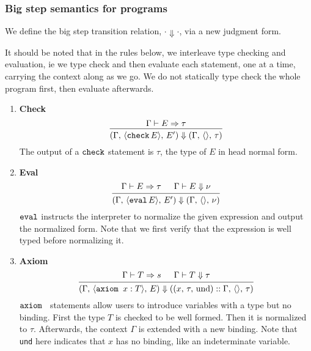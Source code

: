 \documentclass{article}
\begin{document}

\subsubsection{Big step semantics for programs}
We define the big step transition relation, $\cdot \Downarrow \cdot$, via a
new judgment form.

It should be noted that in the rules below, we interleave type checking and 
evaluation, ie we type check and then evaluate each statement, one at a time,
carrying the context along as we go.
We do not statically type check the whole program first, then evaluate
afterwards.

\begin{enumerate}
\item \textbf{Check} \\
  \[
    \begin{prooftree}
      \hypo{\Gamma \vdash E \Rightarrow \tau}
      \infer1{(\Gamma, \, \langle \checkk \, E \rangle, \, E') \Downarrow
        (\Gamma, \, \langle \rangle, \, \tau)}
    \end{prooftree}
  \]
  The output of a $\texttt{check}$ statement is $\tau$, the type of $E$ in head
  normal form. 

\item \textbf{Eval} \\
  \[
    \begin{prooftree}
      \hypo{\Gamma \vdash E \Rightarrow \tau}
      \hypo{\Gamma \vdash E \Downarrow \nu}
      \infer2{(\Gamma, \, \langle \evall \, E \rangle, \, E') \Downarrow
        (\Gamma, \, \langle \rangle, \, \nu)}
    \end{prooftree}
  \]
  $\texttt{eval}$ instructs the interpreter to normalize the given expression and output
  the normalized form.
  Note that we first verify that the expression is well typed before normalizing
  it. 

\item \textbf{Axiom} \\
  \[
    \begin{prooftree}
      \hypo{\Gamma \vdash T \Rightarrow s}
      \hypo{\Gamma \vdash T \Downarrow \tau}
      \infer2{(\Gamma, \, \langle \axiom x : T \rangle, \, E) \Downarrow
        ((x, \, \tau, \, \text{und}) :: \Gamma, \, \langle \rangle, \, \tau)}
    \end{prooftree}
  \]
  $\texttt{axiom }$ statements allow users to introduce variables with a type but no
  binding.
  First the type $T$ is checked to be well formed. Then it is normalized to $\tau$.
  Afterwards, the context $\Gamma$ is extended with a new binding.
  Note that \texttt{und} here indicates that $x$ has no binding, like an indeterminate
  variable.


\end{enumerate}
\end{document}

